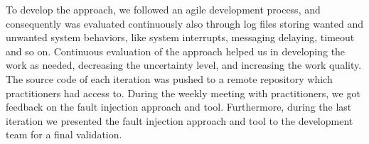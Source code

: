 
To develop the approach, we followed an agile development process, and consequently \approach{} was evaluated continuously also through log files storing wanted and unwanted system behaviors, like system interrupts, messaging delaying, timeout and so on. Continuous evaluation of the approach helped us in developing the work as needed, decreasing the uncertainty level, and increasing the work quality. The source code of each iteration was pushed to a remote repository which practitioners had access to. During the weekly meeting with practitioners, we got feedback on the fault injection approach and tool. Furthermore, during the last iteration we presented the fault injection approach and tool to the development team for a final validation.


%

